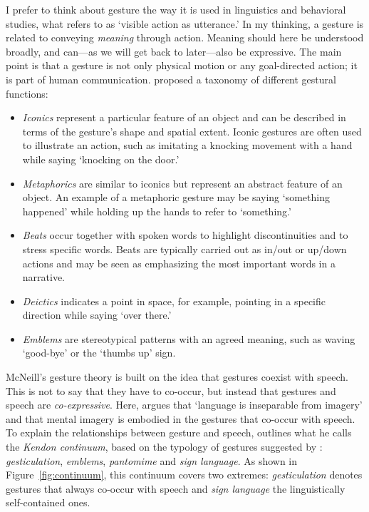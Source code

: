 I prefer to think about gesture the way it is used in linguistics and behavioral studies, what \citet[p.7]{kendon_gesture_2004} refers to as `visible action as utterance.' In my thinking, a gesture is related to conveying \emph{meaning} through action. Meaning should here be understood broadly, and can---as we will get back to later---also be expressive. The main point is that a gesture is not only physical motion or any goal-directed action; it is part of human communication. \citet[p.12-19]{mcneill_hand_1992} proposed a taxonomy of different gestural functions:

\begin{itemize}
\item \emph{Iconics} represent a particular feature of an object and can be described in terms of the gesture's shape and spatial extent. Iconic gestures are often used to illustrate an action, such as imitating a knocking movement with a hand while saying `knocking on the door.'
\item \emph{Metaphorics} are similar to iconics but represent an abstract feature of an object. An example of a metaphoric gesture may be saying `something happened' while holding up the hands to refer to `something.'
\item \emph{Beats} occur together with spoken words to highlight discontinuities and to stress specific words. Beats are typically carried out as in/out or up/down actions and may be seen as emphasizing the most important words in a narrative.
\item \emph{Deictics} indicates a point in space, for example, pointing in a specific direction while saying `over there.'
\item \emph{Emblems} are stereotypical patterns with an agreed meaning, such as waving `good-bye' or the `thumbs up' sign.
\end{itemize}

McNeill's gesture theory is built on the idea that gestures coexist with speech. This is not to say that they have to co-occur, but instead that gestures and speech are \emph{co-expressive}. Here, \citet[p.15]{mcneill_gesture_2005} argues that `language is inseparable from imagery' and that mental imagery is embodied in the gestures that co-occur with speech.
To explain the relationships between gesture and speech, \citet[p.37]{mcneill_hand_1992} outlines what he calls the \emph{Kendon continuum}, based on the typology of gestures suggested by \citet{kendon_gesticulation_1980}: \emph{gesticulation}, \emph{emblems}, \emph{pantomime} and \emph{sign language}. As shown in Figure~\ref{fig:continuum}, this continuum covers two extremes: \emph{gesticulation} denotes gestures that always co-occur with speech and \emph{sign language} the linguistically self-contained ones.

